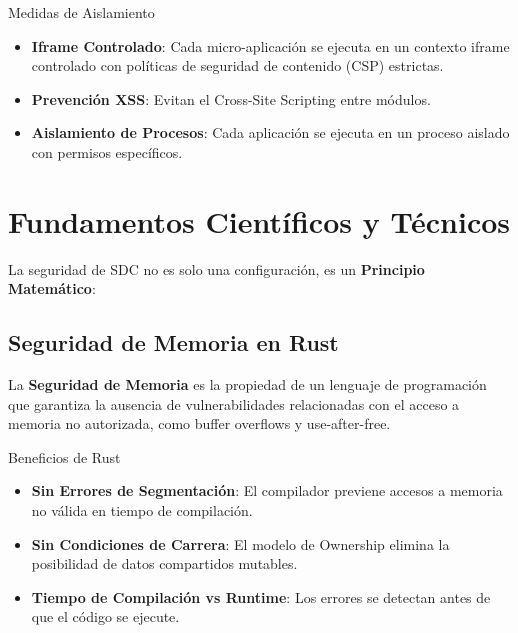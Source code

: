 \begin{caja}{Medidas de Aislamiento}
\begin{itemize}
\item \textbf{Iframe Controlado}: Cada micro-aplicación se ejecuta en un contexto iframe controlado con políticas de seguridad de contenido (CSP) estrictas.
\item \textbf{Prevención XSS}: Evitan el Cross-Site Scripting entre módulos.
\item \textbf{Aislamiento de Procesos}: Cada aplicación se ejecuta en un proceso aislado con permisos específicos.
\end{itemize}
\end{caja}


\section{Fundamentos Científicos y Técnicos}

La seguridad de SDC no es solo una configuración, es un \textbf{Principio Matemático}:

\subsection{Seguridad de Memoria en Rust}

\begin{definicion}
La \textbf{Seguridad de Memoria} es la propiedad de un lenguaje de programación que garantiza la ausencia de vulnerabilidades relacionadas con el acceso a memoria no autorizada, como buffer overflows y use-after-free.
\end{definicion}


\begin{caja}{Beneficios de Rust}
\begin{itemize}
\item \textbf{Sin Errores de Segmentación}: El compilador previene accesos a memoria no válida en tiempo de compilación.
\item \textbf{Sin Condiciones de Carrera}: El modelo de Ownership elimina la posibilidad de datos compartidos mutables.
\item \textbf{Tiempo de Compilación vs Runtime}: Los errores se detectan antes de que el código se ejecute.
\end{itemize}
\end{caja}


